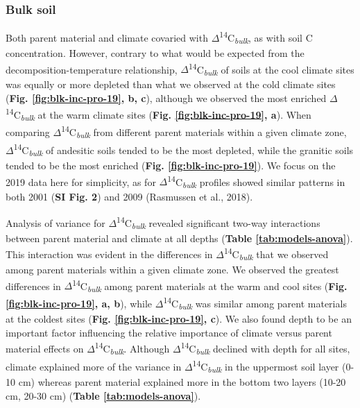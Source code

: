 \documentclass[english,man,floatsintext]{apa6}
\begin{document}
\hypertarget{bulk-soil}{%
\subsubsection{Bulk soil}\label{bulk-soil}}

Both parent material and climate covaried with \(\Delta\)\textsuperscript{14}C\textsubscript{\emph{bulk}}, as with soil C concentration. However, contrary to what would be expected from the decomposition-temperature relationship, \(\Delta\)\textsuperscript{14}C\textsubscript{\emph{bulk}} of soils at the cool climate sites was equally or more depleted than what we observed at the cold climate sites (\textbf{Fig. \ref{fig:blk-inc-pro-19}, b, c}), although we observed the most enriched \(\Delta\)\textsuperscript{14}C\textsubscript{\emph{bulk}} at the warm climate sites (\textbf{Fig. \ref{fig:blk-inc-pro-19}, a}). When comparing \(\Delta\)\textsuperscript{14}C\textsubscript{\emph{bulk}} from different parent materials within a given climate zone, \(\Delta\)\textsuperscript{14}C\textsubscript{\emph{bulk}} of andesitic soils tended to be the most depleted, while the granitic soils tended to be the most enriched (\textbf{Fig. \ref{fig:blk-inc-pro-19}}). We focus on the 2019 data here for simplicity, as for \(\Delta\)\textsuperscript{14}C\textsubscript{\emph{bulk}} profiles showed similar patterns in both 2001 (\textbf{SI Fig. 2}) and 2009 (Rasmussen et al., 2018).

Analysis of variance for \(\Delta\)\textsuperscript{14}C\textsubscript{\emph{bulk}} revealed significant two-way interactions between parent material and climate at all depths (\textbf{Table \ref{tab:models-anova}}). This interaction was evident in the differences in \(\Delta\)\textsuperscript{14}C\textsubscript{\emph{bulk}} that we observed among parent materials within a given climate zone. We observed the greatest differences in \(\Delta\)\textsuperscript{14}C\textsubscript{\emph{bulk}} among parent materials at the warm and cool sites (\textbf{Fig. \ref{fig:blk-inc-pro-19}, a, b}), while \(\Delta\)\textsuperscript{14}C\textsubscript{\emph{bulk}} was similar among parent materials at the coldest sites (\textbf{Fig. \ref{fig:blk-inc-pro-19}, c}). We also found depth to be an important factor influencing the relative importance of climate versus parent material effects on \(\Delta\)\textsuperscript{14}C\textsubscript{\emph{bulk}}. Although \(\Delta\)\textsuperscript{14}C\textsubscript{\emph{bulk}} declined with depth for all sites, climate explained more of the variance in \(\Delta\)\textsuperscript{14}C\textsubscript{\emph{bulk}} in the uppermost soil layer (0-10 cm) whereas parent material explained more in the bottom two layers (10-20 cm, 20-30 cm) (\textbf{Table \ref{tab:models-anova}}).
\end{document}
